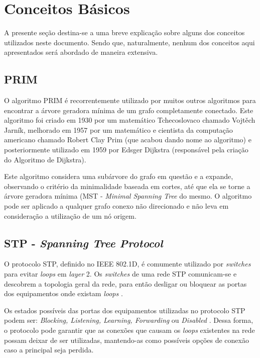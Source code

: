\documentclass[12pt]{article}
\begin{document}
\section{Conceitos Básicos}

A presente seção destina-se a uma breve explicação sobre alguns dos conceitos utilizados neste documento. Sendo que, naturalmente, nenhum dos conceitos aqui apresentados será abordado de maneira extensiva.

\subsection{PRIM}
\label{subsec:Prim}
O algoritmo PRIM é recorrentemente utilizado por muitos outros algoritmos para encontrar a árvore geradora mínima de um grafo completamente conectado. Este algoritmo foi criado em 1930 por um matemático Tchecoslovaco chamado Vojtěch Jarník, melhorado em 1957 por um matemático e cientista da computação americano chamado Robert Clay Prim (que acabou dando nome ao algoritmo) e posteriormente utilizado em 1959 por Edsger Dijkstra (responsável pela criação do Algoritmo de Dijkstra).

Este algoritmo considera uma subárvore do grafo em questão e a expande, observando o critério da minimalidade baseada em cortes, até que ela se torne a árvore geradora mínima (MST - \emph{Minimal Spanning Tree} do mesmo. O algoritmo pode ser aplicado a qualquer grafo conexo não direcionado e não leva em consideração a utilização de um nó origem.

\subsection{STP - \emph{Spanning Tree Protocol}}
\label{subsec:STP}
O protocolo STP, definido no IEEE 802.1D, é comumente utilizado por \emph{switches} para evitar \emph{loops} em \emph{layer} 2. Os \emph{switches} de uma rede STP comunicam-se e descobrem a topologia geral da rede, para então desligar ou bloquear as portas dos equipamentos onde existam \emph{loops} \cite{Art_Krishnan}.

Os estados possíveis das portas dos equipamentos utilizadas no protocolo STP podem ser: \emph{Blocking, Listening, Learning, Forwarding} ou \emph{Disabled} \cite{Art_Wojdak}. Dessa forma, o protocolo pode garantir que as conexões que causam os \emph{loops} existentes na rede possam deixar de ser utilizadas, mantendo-as como possíveis opções de conexão caso a principal seja perdida.
\end{document}
